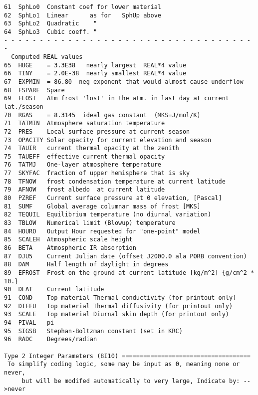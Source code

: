 \documentclass{article}
\begin{document}
\begin{verbatim}
61  SphLo0  Constant coef for lower material 
62  SphLo1  Linear      as for   SphUp above
63  SphLo2  Quadratic    "
64  SphLo3  Cubic coeff. "
- - - - - - - - - - - - - - - - - - - - - - - - - - - - - - - - - - - -
  Computed REAL values 
65  HUGE    = 3.3E38   nearly largest  REAL*4 value
66  TINY    = 2.0E-38  nearly smallest REAL*4 value
67  EXPMIN  = 86.80  neg exponent that would almost cause underflow
68  FSPARE  Spare
69  FLOST   Atm frost 'lost' in the atm. in last day at current lat./season
70  RGAS    = 8.3145  ideal gas constant  (MKS=J/mol/K)
71  TATMIN  Atmosphere saturation temperature
72  PRES    Local surface pressure at current season
73  OPACITY Solar opacity for current elevation and season
74  TAUIR   current thermal opacity at the zenith
75  TAUEFF  effective current thermal opacity 
76  TATMJ   One-layer atmosphere temperature
77  SKYFAC  fraction of upper hemisphere that is sky
78  TFNOW   frost condensation temperature at current latitude
79  AFNOW   frost albedo  at current latitude
80  PZREF   Current surface pressure at 0 elevation, [Pascal]
81  SUMF    Global average columnar mass of frost [MKS]
82  TEQUIL  Equilibrium temperature (no diurnal variation)
83  TBLOW   Numerical limit (Blowup) temperature
84  HOURO   Output Hour requested for "one-point" model
85  SCALEH  Atmospheric scale height
86  BETA    Atmospheric IR absorption
87  DJU5    Current Julian date (offset J2000.0 ala PORB convention)
88  DAM     Half length of daylight in degrees
89  EFROST  Frost on the ground at current latitude [kg/m^2] {g/cm^2 * 10.} 
90  DLAT    Current latitude
91  COND    Top material Thermal conductivity (for printout only)
92  DIFFU   Top material Thermal diffusivity (for printout only)
93  SCALE   Top material Diurnal skin depth (for printout only)
94  PIVAL   pi
95  SIGSB   Stephan-Boltzman constant (set in KRC)
96  RADC    Degrees/radian

Type 2 Integer Parameters (8I10) ====================================
 To simplify coding logic, some may be input as 0, meaning none or never,
     but will be modifed automatically to very large, Indicate by: -->never 


\end{verbatim}
\end{document}
